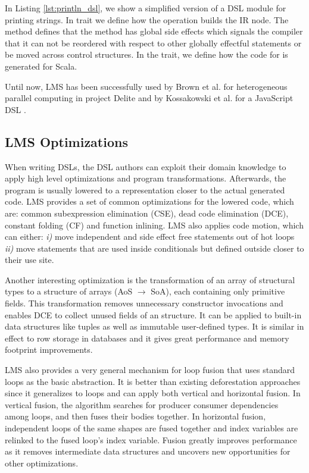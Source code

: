  
In Listing \ref{lst:println_dsl}, we show a simplified version of a DSL module
for printing strings. In trait  we define how the
 operation builds the IR node. The  method
defines that the  method has global side effects which signals the
compiler that it can not be reordered with respect to other globally effectful
statements or be moved across control structures. In the 
trait, we define how the code for  is generated for Scala.

Until now, LMS has been successfully used by Brown et al. for heterogeneous
parallel computing in project Delite \cite{brown_heterogeneous_2011, dsl11} and by
Kossakowski et al. for a JavaScript DSL \cite{greg}.

\subsection{LMS Optimizations}
\label{subsec:lms-optimizations}
When writing DSLs, the DSL authors can exploit their domain knowledge to apply
high level optimizations and program transformations. Afterwards, the program is
usually lowered to a representation closer to the actual generated code. LMS
provides a set of common optimizations for the lowered code, which are: common
subexpression elimination (CSE), dead code elimination (DCE), constant folding
(CF) and function inlining. LMS also applies code motion, which can either:
\emph{i)} move independent and side effect free statements out of hot loops
\emph{ii)} move statements that are used inside conditionals but defined
outside closer to their use site.

Another interesting optimization is the transformation of an array of structural
types to a structure of arrays (AoS $\rightarrow$ SoA), each containing only
primitive fields. This transformation removes unnecessary constructor
invocations and enables DCE to collect unused fields of an structure. It can be
applied to built-in data structures like tuples as well as immutable
user-defined types. It is similar in effect to row storage in databases and it
gives great performance and memory footprint improvements.

LMS also provides a very general mechanism for loop fusion that uses
standard loops as the basic abstraction. It is better than existing
deforestation approaches since it generalizes to loops and can apply both
vertical and horizontal fusion. In vertical fusion, the algorithm searches for
producer consumer dependencies among loops, and then fuses their bodies
together. In horizontal fusion, independent loops of the same shapes are fused
together and index variables are relinked to the fused loop's index variable.
Fusion greatly improves performance as it removes intermediate data structures
and uncovers new opportunities for other optimizations.

